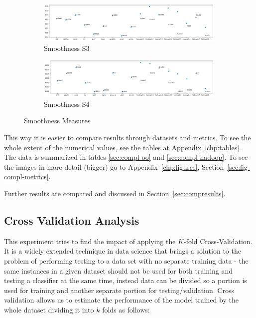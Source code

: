 \begin{figure}[h!]\ContinuedFloat
    \centering
    \begin{subfigure}{0.496\textwidth}
        \includegraphics[width=0.99\textwidth]{figures/smoothness-S3.png}
        \caption{Smoothness S3}
        \label{fig:smoothness-s3}
    \end{subfigure}
    \begin{subfigure}{0.496\textwidth}
        \includegraphics[width=0.99\textwidth]{figures/smoothness-S4.png}
        \caption{Smoothness S4}
        \label{fig:smoothness-s4}
    \end{subfigure}
    \caption{Smoothness Measures}
    \label{fig:smoothness}
\end{figure}

This way it is easier to compare results through datasets and metrics. To see 
the whole extent of the numerical values, see the tables at 
Appendix~\ref{chp:tables}. The data is summarized in tables \ref{sec:compl-oo} 
and \ref{sec:compl-hadoop}. To see the images in more detail (bigger) go to 
Appendix~\ref{chp:figures}, Section~\ref{sec:fig-compl-metrics}.

Further results are compared and discussed in Section~\ref{sec:compresults}.

\subsection{Cross Validation Analysis}\label{sec:exp-kfold}

This experiment tries to find the impact of applying the $K$-fold 
Cross-Validation. It is a widely extended technique in data science that brings 
a solution to the problem of performing testing to a data set with no separate 
training data - the same instances in a given dataset should not be used for 
both training and testing a classifier at the same time, instead data can be 
divided so a portion is used for training and another separate portion for 
testing/validation. Cross validation allows us to estimate the performance of 
the model trained by the whole dataset dividing it into $k$ folds as follows:

